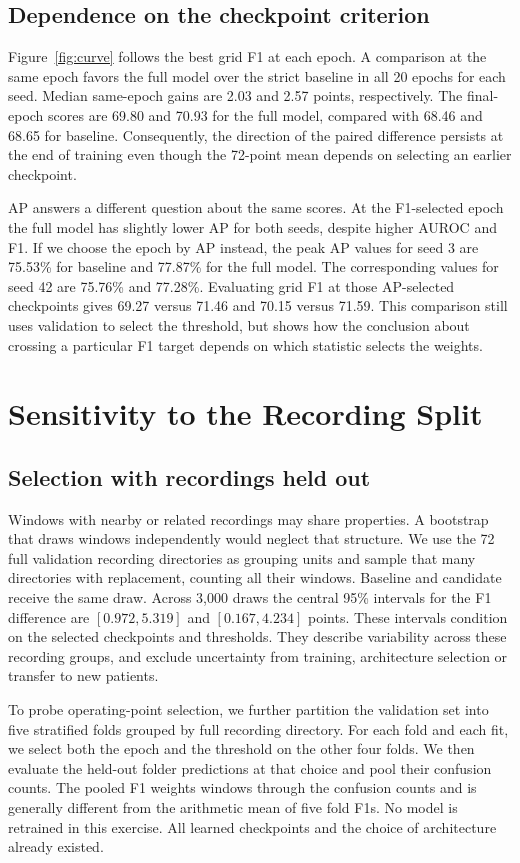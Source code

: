 \documentclass{article}
\begin{document}
\subsection{Dependence on the checkpoint criterion}
Figure~\ref{fig:curve} follows the best grid F1 at each epoch. A comparison at the same epoch favors the full model over the strict baseline in all 20 epochs for each seed. Median same-epoch gains are 2.03 and 2.57 points, respectively. The final-epoch scores are 69.80 and 70.93 for the full model, compared with 68.46 and 68.65 for baseline. Consequently, the direction of the paired difference persists at the end of training even though the 72-point mean depends on selecting an earlier checkpoint.



AP answers a different question about the same scores. At the F1-selected epoch the full model has slightly lower AP for both seeds, despite higher AUROC and F1. If we choose the epoch by AP instead, the peak AP values for seed 3 are 75.53\% for baseline and 77.87\% for the full model. The corresponding values for seed 42 are 75.76\% and 77.28\%. Evaluating grid F1 at those AP-selected checkpoints gives 69.27 versus 71.46 and 70.15 versus 71.59. This comparison still uses validation to select the threshold, but shows how the conclusion about crossing a particular F1 target depends on which statistic selects the weights.

\section{Sensitivity to the Recording Split}
\subsection{Selection with recordings held out}
Windows with nearby or related recordings may share properties. A bootstrap that draws windows independently would neglect that structure. We use the 72 full validation recording directories as grouping units and sample that many directories with replacement, counting all their windows. Baseline and candidate receive the same draw. Across 3,000 draws the central 95\% intervals for the F1 difference are $[0.972,5.319]$ and $[0.167,4.234]$ points. These intervals condition on the selected checkpoints and thresholds. They describe variability across these recording groups, and exclude uncertainty from training, architecture selection or transfer to new patients.

To probe operating-point selection, we further partition the validation set into five stratified folds grouped by full recording directory. For each fold and each fit, we select both the epoch and the threshold on the other four folds. We then evaluate the held-out folder predictions at that choice and pool their confusion counts. The pooled F1 weights windows through the confusion counts and is generally different from the arithmetic mean of five fold F1s. No model is retrained in this exercise. All learned checkpoints and the choice of architecture already existed.
\end{document}

